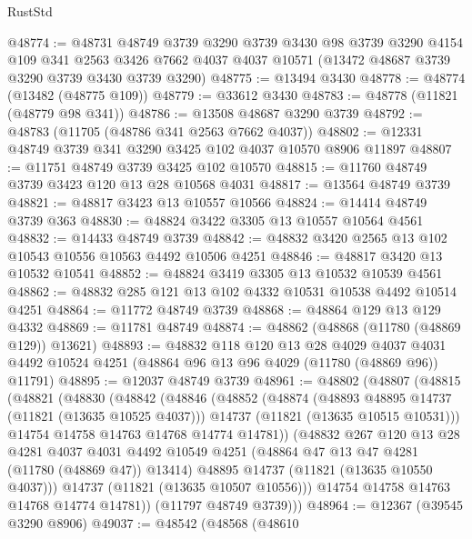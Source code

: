 \begin{lexlean}{RustStd}
\begin{coremodule}
@48774 := @48731
    @48749
    @3739
    @3290
    @3739
    @3430
    @98
    @3739
    @3290
    @4154
    @109
    @341
    @2563
    @3426
    @7662
    @4037
    @4037
    @10571
    (@13472 @48687 @3739 @3290 @3739 @3430 @3739 @3290)
@48775 := @13494 @3430
@48778 := @48774 (@13482 (@48775 @109))
@48779 := @33612 @3430
@48783 := @48778 (@11821 (@48779 @98 @341))
@48786 := @13508 @48687 @3290 @3739
@48792 := @48783 (@11705 (@48786 @341 @2563 @7662 @4037))
@48802 := @12331 @48749 @3739 @341 @3290 @3425 @102 @4037 @10570 @8906 @11897
@48807 := @11751 @48749 @3739 @3425 @102 @10570
@48815 := @11760 @48749 @3739 @3423 @120 @13 @28 @10568 @4031
@48817 := @13564 @48749 @3739
@48821 := @48817 @3423 @13 @10557 @10566
@48824 := @14414 @48749 @3739 @363
@48830 := @48824 @3422 @3305 @13 @10557 @10564 @4561
@48832 := @14433 @48749 @3739
@48842 := @48832 @3420 @2565 @13 @102 @10543 @10556 @10563 @4492 @10506 @4251
@48846 := @48817 @3420 @13 @10532 @10541
@48852 := @48824 @3419 @3305 @13 @10532 @10539 @4561
@48862 := @48832 @285 @121 @13 @102 @4332 @10531 @10538 @4492 @10514 @4251
@48864 := @11772 @48749 @3739
@48868 := @48864 @129 @13 @129 @4332
@48869 := @11781 @48749
@48874 := @48862 (@48868 (@11780 (@48869 @129)) @13621)
@48893 := @48832
    @118
    @120
    @13
    @28
    @4029
    @4037
    @4031
    @4492
    @10524
    @4251
    (@48864 @96 @13 @96 @4029 (@11780 (@48869 @96)) @11791)
@48895 := @12037 @48749 @3739
@48961 := @48802
    (@48807
      (@48815
        (@48821
          (@48830
            (@48842
              (@48846
                (@48852
                  (@48874
                    (@48893 @48895 @14737 (@11821 (@13635 @10525 @4037)))
                    @14737
                    (@11821 (@13635 @10515 @10531)))
                  @14754
                  @14758
                  @14763
                  @14768
                  @14774
                  @14781))
              (@48832
                @267
                @120
                @13
                @28
                @4281
                @4037
                @4031
                @4492
                @10549
                @4251
                (@48864 @47 @13 @47 @4281 (@11780 (@48869 @47)) @13414)
                @48895
                @14737
                (@11821 (@13635 @10550 @4037)))
              @14737
              (@11821 (@13635 @10507 @10556)))
            @14754
            @14758
            @14763
            @14768
            @14774
            @14781))
        (@11797 @48749 @3739)))
@48964 := @12367 (@39545 @3290 @8906)
@49037 := @48542
    (@48568
      (@48610

\end{coremodule}
\end{lexlean}
